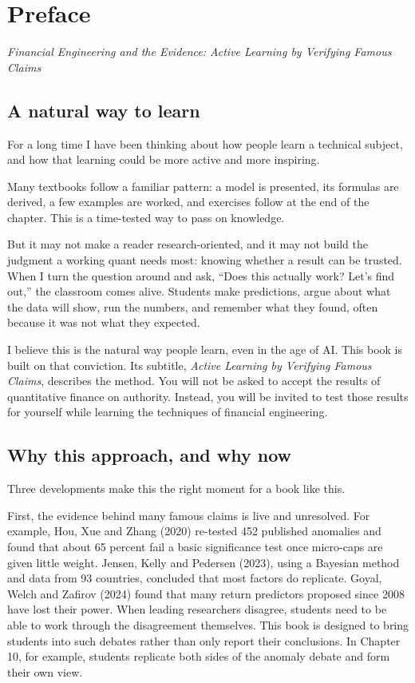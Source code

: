 \chapter*{Preface}

\emph{Financial Engineering and the Evidence: Active Learning by Verifying Famous Claims}

\section*{A natural way to learn}

For a long time I have been thinking about how people learn a technical subject, and how that learning could be more active and more inspiring.

Many textbooks follow a familiar pattern: a model is presented, its formulas are derived, a few examples are worked, and exercises follow at the end of the chapter. This is a time-tested way to pass on knowledge.

But it may not make a reader research-oriented, and it may not build the judgment a working quant needs most: knowing whether a result can be trusted. When I turn the question around and ask, ``Does this actually work? Let's find out,'' the classroom comes alive. Students make predictions, argue about what the data will show, run the numbers, and remember what they found, often because it was not what they expected.

I believe this is the natural way people learn, even in the age of AI. This book is built on that conviction. Its subtitle, \emph{Active Learning by Verifying Famous Claims}, describes the method. You will not be asked to accept the results of quantitative finance on authority. Instead, you will be invited to test those results for yourself while learning the techniques of financial engineering.

\section*{Why this approach, and why now}

Three developments make this the right moment for a book like this.

First, the evidence behind many famous claims is live and unresolved. For example, Hou, Xue and Zhang (2020) re-tested 452 published anomalies and found that about 65 percent fail a basic significance test once micro-caps are given little weight. Jensen, Kelly and Pedersen (2023), using a Bayesian method and data from 93 countries, concluded that most factors do replicate. Goyal, Welch and Zafirov (2024) found that many return predictors proposed since 2008 have lost their power. When leading researchers disagree, students need to be able to work through the disagreement themselves. This book is designed to bring students into such debates rather than only report their conclusions. In Chapter 10, for example, students replicate both sides of the anomaly debate and form their own view.

